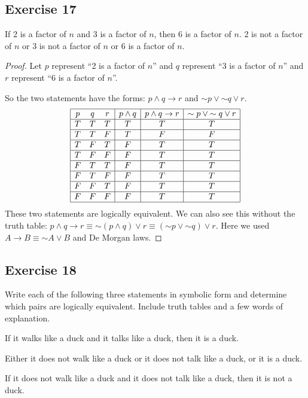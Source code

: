 \documentclass[14pt]{extarticle}
\begin{document}
\subsection{Exercise 17} 
If 2 is a factor of $n$ and 3 is a factor of $n$, then 6 is a factor of $n$. 2 is not a factor of $n$ or 3 is not a factor of $n$ or 6 is a factor of $n$.

\begin{proof} 
Let $p$ represent “2 is a factor of $n$” and $q$ represent “3 is a factor of $n$” and $r$ represent ``6 is a factor of $n$''.

So the two statements have the forms: $p \wedge q \to r$ and ${\sim p} \vee {\sim q} \vee r$.
$$ 
\begin{array}{|ccc|c|c|c|} 
\hline 
p & q & r & p \wedge q & p \wedge q \to r & {\sim p} \vee {\sim q} \vee r \\ 
\hline 
T & T & T & T & T & T \\ 
\hline 
T & T & F & T & F & F \\ 
\hline 
T & F & T & F & T & T \\ 
\hline 
T & F & F & F & T & T \\
\hline 
F & T & T & F & T & T \\ 
\hline 
F & T & F & F & T & T \\ 
\hline 
F & F & T & F & T & T \\ 
\hline 
F & F & F & F & T & T \\ 
\hline 
\end{array} 
$$
These two statements are logically equivalent. We can also see this without the truth table: $p \wedge q \to r \equiv {\sim (p \wedge q)} \vee r \equiv ({\sim p} \vee {\sim q}) \vee r$. Here we used $A \to B \equiv {\sim A} \vee B$ and De Morgan laws. \end{proof}

\subsection{Exercise 18} 
Write each of the following three statements in symbolic form and determine which pairs are logically equivalent. Include truth tables and a few words of explanation.

If it walks like a duck and it talks like a duck, then it is a duck.

Either it does not walk like a duck or it does not talk like a duck, or it is a duck.

If it does not walk like a duck and it does not talk like a duck, then it is not a duck.
\end{document}
